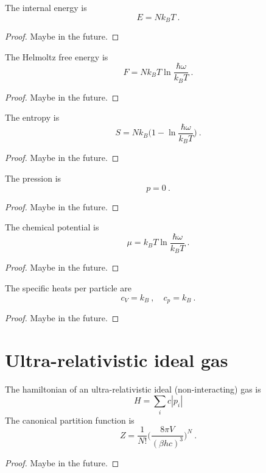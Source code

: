     The internal energy is 
    \begin{equation*}
        E = N k_B T ~.
    \end{equation*}
    \begin{proof}
        Maybe in the future.
    \end{proof}
    
    The Helmoltz free energy is 
    \begin{equation*}
        F = N k_B T \ln \frac{\hbar \omega}{k_B T} ~.
    \end{equation*}
    \begin{proof}
        Maybe in the future.
    \end{proof}
    
    The entropy is 
    \begin{equation*}
        S = N k_B \Big ( 1 - \ln \frac{\hbar \omega}{k_B T} \Big) ~.
    \end{equation*}
    \begin{proof}
        Maybe in the future.
    \end{proof}
    
    The pression is 
    \begin{equation*}
        p = 0 ~.
    \end{equation*}
    \begin{proof}
        Maybe in the future.
    \end{proof}
    
    The chemical potential is 
    \begin{equation*}
        \mu = k_B T \ln \frac{\hbar \omega}{k_B T} ~.
    \end{equation*}
    \begin{proof}
        Maybe in the future.
    \end{proof}

    The specific heats per particle are 
    \begin{equation*}
        c_V = k_B ~, \quad c_p = k_B ~. 
    \end{equation*}
    \begin{proof}
        Maybe in the future.
    \end{proof}

\section{Ultra-relativistic ideal gas}

    The hamiltonian of an ultra-relativistic ideal (non-interacting) gas is 
    \begin{equation*}
        H = \sum_i c |p_i|
    \end{equation*}
    The canonical partition function is 
    \begin{equation*}
        Z = \frac{1}{N!} \Big ( \frac{8 \pi V}{(\beta h c)^3}\Big)^N ~.
    \end{equation*}
    \begin{proof}
        Maybe in the future.
    \end{proof}
    
